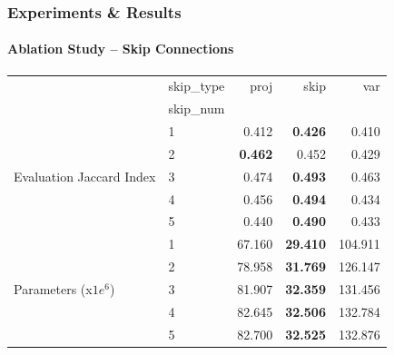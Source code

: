 \documentclass[t,aspectratio=169]{beamer}
\begin{document}
\begin{frame}[fragile]
  \frametitle{Experiments \& Results}
  \framesubtitle{Ablation Study -- Skip Connections}
  \vspace*{-1cm}
  \color{black}
  \begin{table}[ht]
    \centering
    \label{tab:skip_results}
    \begin{tabular}{llrrr}
                                                   & skip\_type & proj           & skip            & var     \\
                                                   & skip\_num  &                &                 &         \\
      \midrule
      \multirow[t]{5}{*}{Evaluation Jaccard Index} & 1          & 0.412          & \textbf{0.426}  & 0.410   \\
                                                   & 2          & \textbf{0.462} & 0.452           & 0.429   \\
                                                   & 3          & 0.474          & \textbf{0.493}  & 0.463   \\
                                                   & 4          & 0.456          & \textbf{0.494}  & 0.434   \\
                                                   & 5          & 0.440          & \textbf{0.490}  & 0.433   \\
      \cline{1-5}
      \multirow[t]{5}{*}{Parameters (x$1e^6$)}     & 1          & 67.160         & \textbf{29.410} & 104.911 \\
                                                   & 2          & 78.958         & \textbf{31.769} & 126.147 \\
                                                   & 3          & 81.907         & \textbf{32.359} & 131.456 \\
                                                   & 4          & 82.645         & \textbf{32.506} & 132.784 \\
                                                   & 5          & 82.700         & \textbf{32.525} & 132.876 \\
      \cline{1-5}
      \bottomrule
    \end{tabular}
  \end{table}
  
\end{frame}
\end{document}
